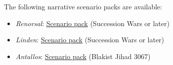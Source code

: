The following narrative scenario packs are available:

\begin{itemize}

\item \emph{Renorsal}: \href{https://raw.githubusercontent.com/Eudicods/outworlds-wastes/rules-pdf/renorsal.pdf}{Scenario pack} (Succession Wars or later)

\item \emph{Linden}: \href{https://raw.githubusercontent.com/Eudicods/outworlds-wastes/rules-pdf/linden.pdf}{Scenario pack} (Succession Wars or later)

\item \emph{Antallos}: \href{https://raw.githubusercontent.com/Eudicods/outworlds-wastes/rules-pdf/antallos.pdf}{Scenario pack} (Blakist Jihad 3067)

\end{itemize}
